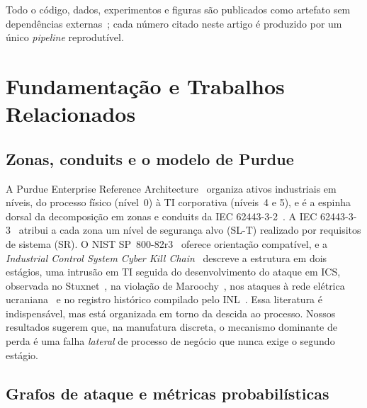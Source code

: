 Todo o código, dados, experimentos e figuras são publicados como artefato sem
dependências externas~\cite{capmartifact}; cada número citado neste artigo é
produzido por um único \emph{pipeline} reprodutível.

\section{Fundamentação e Trabalhos Relacionados}
\label{sec:fundamentacao}

\subsection{Zonas, conduits e o modelo de Purdue}

A Purdue Enterprise Reference Architecture~\cite{williams1994purdue} organiza
ativos industriais em níveis, do processo físico (nível~0) à TI corporativa
(níveis~4 e 5), e é a espinha dorsal da decomposição em zonas e conduits da IEC
62443-3-2~\cite{iec624433302020}. A IEC 62443-3-3~\cite{iec624433303} atribui a
cada zona um nível de segurança alvo (SL-T) realizado por requisitos de sistema
(SR). O NIST SP~800-82r3~\cite{nist80082r3} oferece orientação compatível, e a
\emph{Industrial Control System Cyber Kill Chain}~\cite{assante2015killchain}
descreve a estrutura em dois estágios, uma intrusão em TI seguida do desenvolvimento do
ataque em ICS, observada no Stuxnet~\cite{langner2011stuxnet},
na violação de Maroochy~\cite{slay2007maroochy}, nos ataques à rede elétrica
ucraniana~\cite{eisac2016ukraine} e no registro histórico compilado pelo
INL~\cite{inl2018history}. Essa literatura é indispensável, mas está organizada
em torno da descida ao processo. Nossos resultados sugerem que, na manufatura
discreta, o mecanismo dominante de perda é uma falha \emph{lateral} de processo
de negócio que nunca exige o segundo estágio.

\subsection{Grafos de ataque e métricas probabilísticas}


